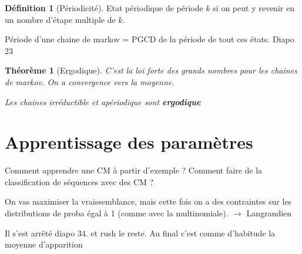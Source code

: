 \documentclass{article}
\theoremstyle{plain}%
\newtheorem{thm}{Théorème}[section]
\theoremstyle{definition}
\newtheorem{defn}{Définition}[section]
\theoremstyle{remark}
\begin{document}
\begin{defn}[Périodicité]
    Etat périodique de période $ k $ si on peut y revenir en un nombre d'étape multiple de $ k $.

    Période d'une chaine de markov = PGCD de la période de tout ces états. Diapo 23
\end{defn}

\begin{thm}[Ergodique]
    C'est la loi forte des grands nombres pour les chaines de markov. On a convergence vers la moyenne.

    Les chaines irréductible et apériodique sont \textbf{ergodique}
\end{thm}

\section{Apprentissage des paramètres}
Comment apprendre une CM à partir d'exemple ? Comment faire de la classification de séquences avec des CM ? 

On vas maximiser la vraissemblance, mais cette fois on a des contraintes sur les distributions de proba égal à 1 (comme avec la multinomiale). $\rightarrow$ Langrandien 

Il s'est arrêté diapo 34. et rush le reste. Au final c'est comme d'habitude la moyenne d’apparition
\end{document}
